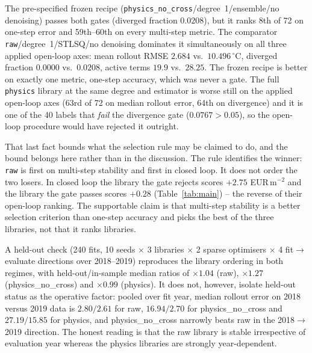 The pre-specified frozen recipe
(\texttt{physics\_no\_cross}/degree~1/ensemble/no denoising) passes both gates
(diverged fraction $0.0208$), but it ranks 8th of 72 on one-step error and 59th--60th on
every multi-step metric. The comparator \texttt{raw}/degree~1/STLSQ/no denoising
dominates it simultaneously on all three applied open-loop axes: mean rollout RMSE $2.684$
vs.\ $10.496\,^\circ$C, diverged fraction $0.0000$ vs.\ $0.0208$, active terms $19.9$ vs.\
$28.25$. The frozen recipe is better on exactly one metric, one-step accuracy, which was
never a gate. The full \texttt{physics} library at the same degree and estimator is worse
still on the applied open-loop axes (63rd of 72 on median rollout error, 64th on divergence) and it is one of the 40 labels that \emph{fail} the divergence gate
($0.0767 > 0.05$), so the open-loop procedure would have rejected it outright.

That last fact bounds what the selection rule may be claimed to do, and the bound belongs
here rather than in the discussion. The rule identifies the winner: \texttt{raw} is first
on multi-step stability and first in closed loop. It does not order the two losers. In
closed loop the library the gate rejects scores $+2.75$ EUR\,m$^{-2}$ and the library the
gate passes scores $+0.28$ (Table~\ref{tab:main}) -- the reverse of their open-loop
ranking. The supportable claim is that multi-step stability is a better selection criterion
than one-step accuracy and picks the best of the three libraries, not that it ranks
libraries.

A held-out check (240 fits, 10 seeds $\times$ 3 libraries $\times$ 2 sparse optimisers
$\times$ 4 fit$\to$evaluate directions over 2018--2019) reproduces the library ordering in
both regimes, with held-out/in-sample median ratios of $\times 1.04$ (raw), $\times 1.27$
(physics\_no\_cross) and $\times 0.99$ (physics). It does not, however, isolate held-out
status as the operative factor: pooled over fit year, median rollout error on 2018 versus
2019 data is $2.80/2.61$ for raw, $16.94/2.70$ for physics\_no\_cross and $27.19/15.85$ for
physics, and physics\_no\_cross narrowly beats raw in the 2018$\to$2019 direction. The
honest reading is that the raw library is stable irrespective of evaluation year whereas
the physics libraries are strongly year-dependent.

